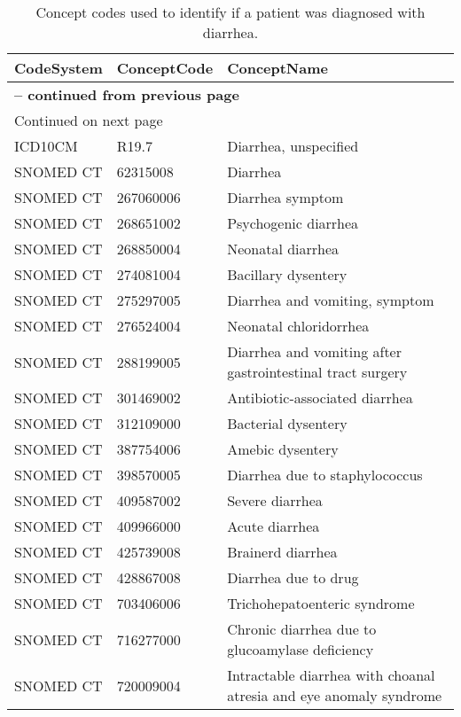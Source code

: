 \begin{longtable}{p{}p{}p{}}
\caption{Concept codes used to identify if a patient was diagnosed with diarrhea.} \\ 
 CodeSystem & ConceptCode & ConceptName \\ 
  \hline 
\endfirsthead 
\multicolumn{3}{p{\textwidth}}{{ \bfseries \tablename \thetable{} -- continued from previous page}} \ 
\hline CodeSystem & ConceptCode & ConceptName \\ \hline 
\endhead 
\hline \multicolumn{3}{p{\textwidth}}{{Continued on next page}} \\ \hline 
\endfoot 
\hline 
\endlastfoot 
 \hline
ICD10CM & R19.7 & Diarrhea, unspecified \\ 
  SNOMED CT & 62315008 & Diarrhea \\ 
  SNOMED CT & 267060006 & Diarrhea symptom \\ 
  SNOMED CT & 268651002 & Psychogenic diarrhea \\ 
  SNOMED CT & 268850004 & Neonatal diarrhea \\ 
  SNOMED CT & 274081004 & Bacillary dysentery \\ 
  SNOMED CT & 275297005 & Diarrhea and vomiting, symptom \\ 
  SNOMED CT & 276524004 & Neonatal chloridorrhea \\ 
  SNOMED CT & 288199005 & Diarrhea and vomiting after gastrointestinal tract surgery \\ 
  SNOMED CT & 301469002 & Antibiotic-associated diarrhea \\ 
  SNOMED CT & 312109000 & Bacterial dysentery \\ 
  SNOMED CT & 387754006 & Amebic dysentery \\ 
  SNOMED CT & 398570005 & Diarrhea due to staphylococcus \\ 
  SNOMED CT & 409587002 & Severe diarrhea \\ 
  SNOMED CT & 409966000 & Acute diarrhea \\ 
  SNOMED CT & 425739008 & Brainerd diarrhea \\ 
  SNOMED CT & 428867008 & Diarrhea due to drug \\ 
  SNOMED CT & 703406006 & Trichohepatoenteric syndrome \\ 
  SNOMED CT & 716277000 & Chronic diarrhea due to glucoamylase deficiency \\ 
  SNOMED CT & 720009004 & Intractable diarrhea with choanal atresia and eye anomaly syndrome \\ 

\end{longtable}
